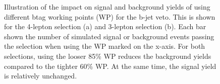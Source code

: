 \begin{figure}[h!]
\captionsetup[subfigure]{position=b}
\centering
{}
\caption{Illustration of the impact on signal and background yields of using different btag working points (WP) for the b-jet veto. This is shown for the 4-lepton selection (a) and 3-lepton selection (b). Each bar shown the number of simulated signal or background events passing the selection when using the WP marked on the x-axis. For both selections, using the looser 85\% WP reduces the background yields compared to the tighter 60\% WP. At the same time, the signal yield is relatively unchanged.}
\label{fig:hmmBveto}
\end{figure}

